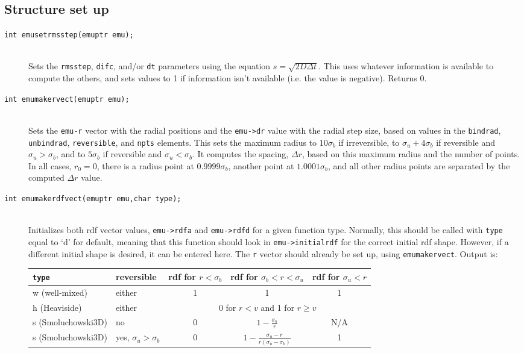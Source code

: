 \documentclass {book}
\newcommand {\ttt} {\texttt}
\begin{document}
\subsection{Structure set up}

\begin{description}

\item[\ttt{int emusetrmsstep(emuptr emu);}]
\hfill \\
Sets the \ttt{rmsstep}, \ttt{difc}, and/or \ttt{dt} parameters using the equation $s=\sqrt{2 D \Delta t}$. This uses whatever information is available to compute the others, and sets values to 1 if information isn't available (i.e. the value is negative). Returns 0.

\item[\ttt{int emumakervect(emuptr emu);}]
\hfill \\
Sets the \ttt{emu-r} vector with the radial positions and the \ttt{emu->dr} value with the radial step size, based on values in the \ttt{bindrad}, \ttt{unbindrad}, \ttt{reversible}, and \ttt{npts} elements. This sets the maximum radius to $10\sigma_b$ if irreversible, to $\sigma_u+4\sigma_b$ if reversible and $\sigma_u>\sigma_b$, and to $5\sigma_b$ if reversible and $\sigma_u<\sigma_b$. It computes the spacing, $\Delta r$, based on this maximum radius and the number of points. In all cases, $r_0=0$, there is a radius point at $0.9999\sigma_b$, another point at $1.0001\sigma_b$, and all other radius points are separated by the computed $\Delta r$ value.

\item[\ttt{int emumakerdfvect(emuptr emu,char type);}]
\hfill \\
Initializes both rdf vector values, \ttt{emu->rdfa} and \ttt{emu->rdfd} for a given function type. Normally, this should be called with \ttt{type} equal to `d' for default, meaning that this function should look in \ttt{emu->initialrdf} for the correct initial rdf shape. However, if a different initial shape is desired, it can be entered here. The \ttt{r} vector should already be set up, using \ttt{emumakervect}. Output is:

\begin{longtable}[c]{llccc}
\ttt{type} & reversible & rdf for $r<\sigma_b$ & rdf for $\sigma_b<r<\sigma_u$ & rdf for $\sigma_u<r$\\
\hline
w (well-mixed) & either & 1 & 1 & 1\\
h (Heaviside) & either & \multicolumn{3}{c}{0 for $r<v$ and 1 for $r \geq v$}\\
s (Smoluchowski3D) & no & 0 & $1-\frac{\sigma_b}{r}$ & N/A\\
s (Smoluchowski3D)  & yes, $\sigma_u > \sigma_b$ & 0 & $1-\frac{\sigma_u-r}{r(\sigma_u - \sigma_b)}$ & 1
\end{longtable}

\end{description}
\end{document}
